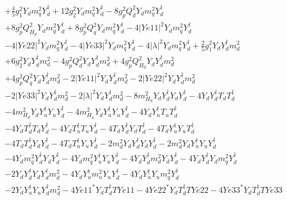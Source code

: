 \begin{align}
 &+\frac{4}{5} g_{1}^{2} {Y_d  m_q^2  Y_{d}^{\dagger}} +12 g_{2}^{2} {Y_d  m_q^2  Y_{d}^{\dagger}} -8 g_{p}^{2} Q_{d}^{2} {Y_d  m_q^2  Y_{d}^{\dagger}} \nonumber \\ 
 &+8 g_{p}^{2} Q_{H_d}^{2} {Y_d  m_q^2  Y_{d}^{\dagger}} +8 g_{p}^{2} Q_{q}^{2} {Y_d  m_q^2  Y_{d}^{\dagger}} -4 |Ye11|^2 {Y_d  m_q^2  Y_{d}^{\dagger}} \nonumber \\ 
 &-4 |Ye22|^2 {Y_d  m_q^2  Y_{d}^{\dagger}} -4 |Ye33|^2 {Y_d  m_q^2  Y_{d}^{\dagger}} -4 |\lambda|^2 {Y_d  m_q^2  Y_{d}^{\dagger}} +\frac{2}{5} g_{1}^{2} {Y_d  Y_{d}^{\dagger}  m_d^2} \nonumber \\ 
 &+6 g_{2}^{2} {Y_d  Y_{d}^{\dagger}  m_d^2} -4 g_{p}^{2} Q_{d}^{2} {Y_d  Y_{d}^{\dagger}  m_d^2} +4 g_{p}^{2} Q_{H_d}^{2} {Y_d  Y_{d}^{\dagger}  m_d^2} \nonumber \\ 
 &+4 g_{p}^{2} Q_{q}^{2} {Y_d  Y_{d}^{\dagger}  m_d^2} -2 |Ye11|^2 {Y_d  Y_{d}^{\dagger}  m_d^2} -2 |Ye22|^2 {Y_d  Y_{d}^{\dagger}  m_d^2} \nonumber \\ 
 &-2 |Ye33|^2 {Y_d  Y_{d}^{\dagger}  m_d^2} -2 |\lambda|^2 {Y_d  Y_{d}^{\dagger}  m_d^2} -8 m_{H_d}^2 {Y_d  Y_{d}^{\dagger}  Y_d  Y_{d}^{\dagger}} -4 {Y_d  Y_{d}^{\dagger}  T_d  T_{d}^{\dagger}} \nonumber \\ 
 &-4 m_{H_d}^2 {Y_d  Y_{u}^{\dagger}  Y_u  Y_{d}^{\dagger}} -4 m_{H_u}^2 {Y_d  Y_{u}^{\dagger}  Y_u  Y_{d}^{\dagger}} -4 {Y_d  Y_{u}^{\dagger}  T_u  T_{d}^{\dagger}} \nonumber \\ 
 &-4 {Y_d  T_{d}^{\dagger}  T_d  Y_{d}^{\dagger}} -4 {Y_d  T_{u}^{\dagger}  T_u  Y_{d}^{\dagger}} -4 {T_d  Y_{d}^{\dagger}  Y_d  T_{d}^{\dagger}} -4 {T_d  Y_{u}^{\dagger}  Y_u  T_{d}^{\dagger}} \nonumber \\ 
 &-4 {T_d  T_{d}^{\dagger}  Y_d  Y_{d}^{\dagger}} -4 {T_d  T_{u}^{\dagger}  Y_u  Y_{d}^{\dagger}} -2 {m_d^2  Y_d  Y_{d}^{\dagger}  Y_d  Y_{d}^{\dagger}} -2 {m_d^2  Y_d  Y_{u}^{\dagger}  Y_u  Y_{d}^{\dagger}} \nonumber \\ 
 &-4 {Y_d  m_q^2  Y_{d}^{\dagger}  Y_d  Y_{d}^{\dagger}} -4 {Y_d  m_q^2  Y_{u}^{\dagger}  Y_u  Y_{d}^{\dagger}} -4 {Y_d  Y_{d}^{\dagger}  m_d^2  Y_d  Y_{d}^{\dagger}} -4 {Y_d  Y_{d}^{\dagger}  Y_d  m_q^2  Y_{d}^{\dagger}} \nonumber \\ 
 &-2 {Y_d  Y_{d}^{\dagger}  Y_d  Y_{d}^{\dagger}  m_d^2} -4 {Y_d  Y_{u}^{\dagger}  m_u^2  Y_u  Y_{d}^{\dagger}} -4 {Y_d  Y_{u}^{\dagger}  Y_u  m_q^2  Y_{d}^{\dagger}} \nonumber \\ 
 &-2 {Y_d  Y_{u}^{\dagger}  Y_u  Y_{d}^{\dagger}  m_d^2} -4 Ye11^* {Y_d  T_{d}^{\dagger}} TYe11 -4 Ye22^* {Y_d  T_{d}^{\dagger}} TYe22 -4 Ye33^* {Y_d  T_{d}^{\dagger}} TYe33 \nonumber \\ 

\end{align}
